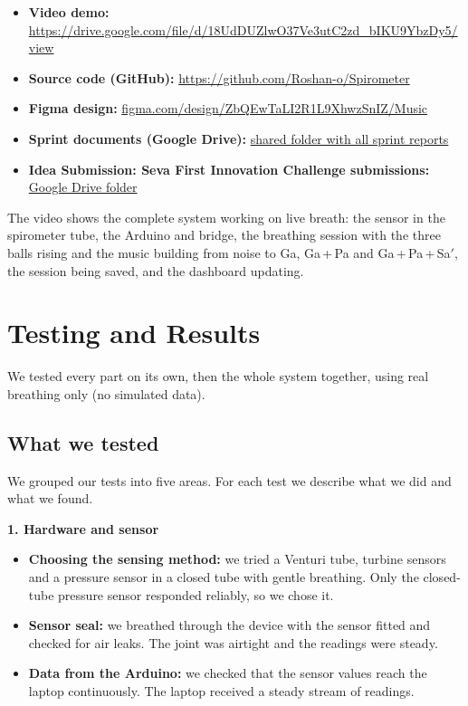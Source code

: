 \documentclass[12pt,a4paper]{article}
\newcommand{\Sah}{Sa\ensuremath{'}}     %
\newcommand{\githuburl}{https://github.com/Roshan-o/Spirometer}
\newcommand{\videourl}{https://drive.google.com/file/d/18UdDUZlwO37Ve3utC2zd_bIKU9YbzDy5/view}
\newcommand{\driveurl}{https://drive.google.com/drive/folders/1bPdsBMErJisqiP8W3hTLAdX8OIbYA5W-?usp=sharing}
\newcommand{\sevaurl}{https://drive.google.com/drive/folders/1aHvxULoR30UtWy43ls5HY10PJA5bWtyK?usp=sharing}
\newcommand{\figmaurl}{https://www.figma.com/design/ZbQEwTaLI2R1L9XhwzSnIZ/Music?t=hc86C48bEpRClTkQ-1}
\begin{document}
\begin{itemize}
  \item \textbf{Video demo:} \url{\videourl}
  \item \textbf{Source code (GitHub):} \url{\githuburl}
  \item \textbf{Figma design:} \href{\figmaurl}{figma.com/design/ZbQEwTaLI2R1L9XhwzSnIZ/Music}
  \item \textbf{Sprint documents (Google Drive):} \href{\driveurl}{shared folder with all sprint reports}
  \item \textbf{Idea Submission: Seva First Innovation Challenge submissions:} \href{\sevaurl}{Google Drive folder}
\end{itemize}

The video shows the complete system working on live breath: the sensor in the spirometer tube, the Arduino and bridge, the breathing session with the three balls rising and the music building from noise to Ga, Ga\,+\,Pa and Ga\,+\,Pa\,+\,\Sah, the session being saved, and the dashboard updating.

\section{Testing and Results}
\label{sec:testing}

We tested every part on its own, then the whole system together, using real breathing only (no simulated data).

\subsection{What we tested}

We grouped our tests into five areas. For each test we describe what we did and what we found.

\textbf{1. Hardware and sensor}
\begin{itemize}
  \item \textbf{Choosing the sensing method:} we tried a Venturi tube, turbine sensors and a pressure sensor in a closed tube with gentle breathing. Only the closed-tube pressure sensor responded reliably, so we chose it.
  \item \textbf{Sensor seal:} we breathed through the device with the sensor fitted and checked for air leaks. The joint was airtight and the readings were steady.
  \item \textbf{Data from the Arduino:} we checked that the sensor values reach the laptop continuously. The laptop received a steady stream of readings.
\end{itemize}
\end{document}
